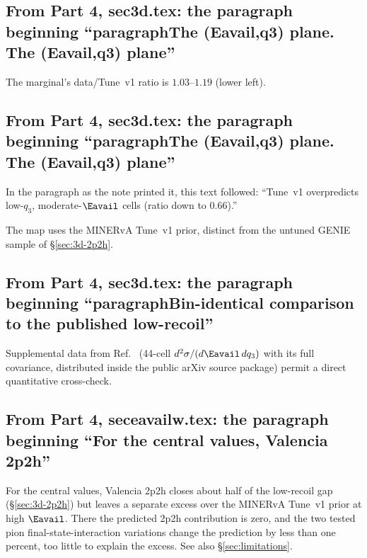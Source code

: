 \subsection{From Part 4, sec3d.tex: the paragraph beginning ``paragraphThe (Eavail,q3) plane. The (Eavail,q3) plane''}
The marginal's data/Tune~v1 ratio is $1.03$--$1.19$ (lower left).

\subsection{From Part 4, sec3d.tex: the paragraph beginning ``paragraphThe (Eavail,q3) plane. The (Eavail,q3) plane''}
In the paragraph as the note printed it, this text followed: ``Tune~v1 overpredicts low-$q_{3}$, moderate-$\Eavail$ cells (ratio down to $0.66$).''\par
The map uses the MINERvA Tune~v1 prior, distinct from the untuned GENIE sample of \S\ref{sec:3d-2p2h}.

\subsection{From Part 4, sec3d.tex: the paragraph beginning ``paragraphBin-identical comparison to the published low-recoil''}
Supplemental data from Ref.~\cite{MINERvA:2022incl} (44-cell $d^{2}\sigma/(d\Eavail\,dq_{3})$ with its full covariance, distributed inside the public arXiv source package) permit a direct quantitative cross-check.

\subsection{From Part 4, seceavailw.tex: the paragraph beginning ``For the central values, Valencia 2p2h''}
For the central values, Valencia 2p2h closes about half of the low-recoil gap (\S\ref{sec:3d-2p2h}) but leaves a separate excess over the MINERvA Tune~v1 prior at high $\Eavail$. There the predicted 2p2h contribution is zero, and the two tested pion final-state-interaction variations change the prediction by less than one percent, too little to explain the excess. See also \S\ref{sec:limitations}.

